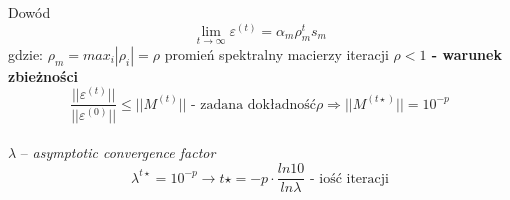 \begin{frame}{}
  \begin{block}{Dowód}
    \[\lim_{t\to\infty} \varepsilon^{(t)} = \alpha _m \rho _m^t s_m\]
    gdzie: $\rho _m = max_i |\rho _i|= \rho$ promień spektralny macierzy iteracji
    \center \textbf{$\rho < 1$ - warunek zbieżności}
    $$ \frac{||\varepsilon^{(t)}||}{||\varepsilon^{(0)}||} \leq ||M^{(t)}|| \text{ - zadana dokładność} \rho\Rightarrow ||M^{(t\star)}|| = 10^{-p}$$
    \\$\lambda$ -- \emph{asymptotic convergence factor}
    \[\lambda^{t\star}=10^{-p} \rightarrow t\star = -p \cdot  \frac{ln 10}{ln \lambda} \text{ - iość iteracji}\]
  \end{block}
\end{frame}
